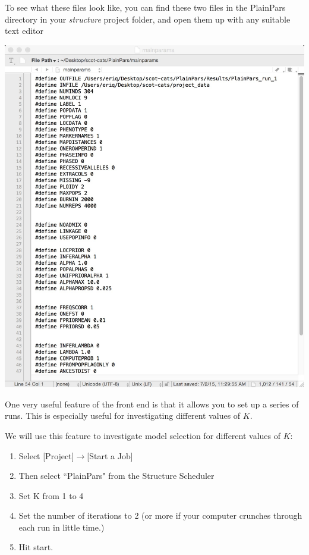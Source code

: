 To see what these files look like, you can find these two files in the PlainPars directory in your {\em structure} project folder, and open them up with any suitable text editor
\begin{center}
\includegraphics[width=.90\textheight]{illus/mainparams.jpg}
\end{center}


One very useful feature of the front end is that it allows you to set up a series of runs.  This is especially useful for investigating different values of $K$.  

We will use this feature to investigate model selection for different values of $K$:
\begin{enumerate}
\item Select [Project]$\rightarrow$[Start a Job]
\item Then select ``PlainPars" from the Structure Scheduler
\item Set K from 1 to 4
\item Set the number of iterations to 2 (or more if your computer crunches through each run
in little time.)
\item Hit start.  
\end{enumerate}

